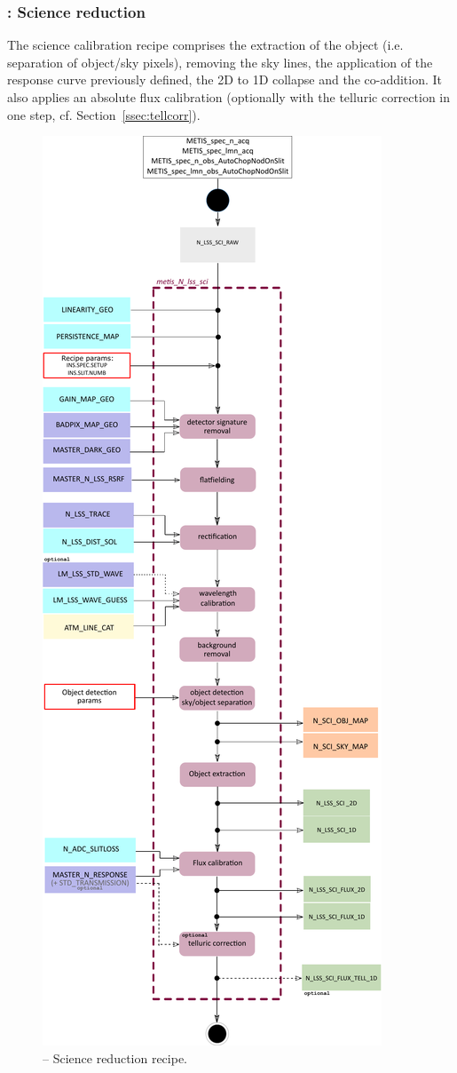 \subsubsection{:  Science reduction}\label{rec:metis_n_lss_sci}
The science calibration recipe comprises the extraction of the object (i.e. separation of object/sky pixels), removing the sky lines, the application of the response curve previously defined, the 2D to 1D collapse and the co-addition. It also applies an absolute flux calibration (optionally with the telluric correction in one step, cf. Section~\ref{ssec:tellcorr}).
\begin{figure}[ht]
  \centering
  \includegraphics[width=0.35\textheight]{figures/metis_N_lss_sci_v0.83.pdf}
  \caption[Recipe: ]{ --
    Science reduction recipe.}
  \label{Fig:rec_N_lss_sci}
\end{figure}
\clearpage

